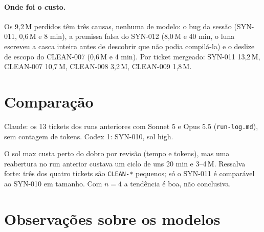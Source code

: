 \documentclass[11pt,a4paper]{article}
\begin{document}
\paragraph{Onde foi o custo.} Os 9,2\,M perdidos têm três causas, nenhuma de
modelo: o bug da sessão (SYN-011, 0,6\,M e 8 min), a premissa falsa do SYN-012
(8,0\,M e 40 min, o luna escreveu a casca inteira antes de descobrir que não
podia compilá-la) e o deslize de escopo do CLEAN-007 (0,6\,M e 4 min). Por
ticket mergeado: SYN-011 13,2\,M, CLEAN-007 10,7\,M, CLEAN-008 3,2\,M, CLEAN-009
1,8\,M.

\section{Comparação}

Claude: os 13 tickets dos runs anteriores com Sonnet 5 e Opus 5.5
(\texttt{run-log.md}), sem contagem de tokens. Codex 1: SYN-010, sol high.

\medskip
{}

\medskip
O sol max custa perto do dobro por revisão (tempo e tokens), mas uma reabertura
no run anterior custava um ciclo de uns 20 min e 3--4\,M. Ressalva forte: três
dos quatro tickets são \texttt{CLEAN-*} pequenos; só o SYN-011 é comparável ao
SYN-010 em tamanho. Com $n=4$ a tendência é boa, não conclusiva.

\section{Observações sobre os modelos}
\end{document}

